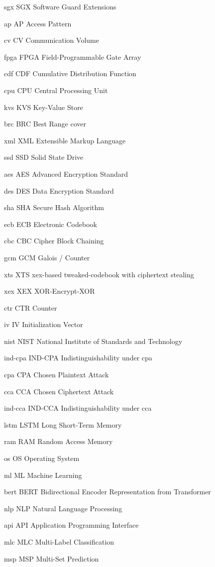 \newacronym%
	{sgx}
	{SGX}
	{Software Guard Extensions}

\newacronym%
	{ap}
	{AP}
	{Access Pattern}

\newacronym%
	{cv}
	{CV}
	{Communication Volume}

\newacronym%
	{fpga}
	{FPGA}
	{Field-Programmable Gate Array}

\newacronym%
	{cdf}
	{CDF}
	{Cumulative Distribution Function}

\newacronym%
	{cpu}
	{CPU}
	{Central Processing Unit}

\newacronym%
	{kvs}
	{KVS}
	{Key-Value Store}

\newacronym%
	{brc}
	{BRC}
	{Best Range cover}

\newacronym%
	{xml}
	{XML}
	{Extensible Markup Language}

\newacronym%
	{ssd}
	{SSD}
	{Solid State Drive}

\newacronym%
	{aes}
	{AES}
	{Advanced Encryption Standard}

\newacronym%
	{des}
	{DES}
	{Data Encryption Standard}

\newacronym%
	{sha}
	{SHA}
	{Secure Hash Algorithm}

\newacronym%
	{ecb}
	{ECB}
	{Electronic Codebook}

\newacronym%
	{cbc}
	{CBC}
	{Cipher Block Chaining}

\newacronym%
	{gcm}
	{GCM}
	{Galois / Counter}

\newacronym%
	{xts}
	{XTS}
	{\acrshort{xex}-based tweaked-codebook with ciphertext stealing}

\newacronym%
	{xex}
	{XEX}
	{XOR-Encrypt-XOR}

\newacronym%
	{ctr}
	{CTR}
	{Counter}

\newacronym%
	{iv}
	{IV}
	{Initialization Vector}

\newacronym%
	{nist}
	{NIST}
	{National Institute of Standards and Technology}

\newacronym%
	{ind-cpa}
	{IND-CPA}
	{Indistinguishability under \acrlong{cpa}}

\newacronym%
	{cpa}
	{CPA}
	{Chosen Plaintext Attack}

\newacronym%
	{cca}
	{CCA}
	{Chosen Ciphertext Attack}

\newacronym%
	{ind-cca}
	{IND-CCA}
	{Indistinguishability under \acrlong{cca}}

\newacronym%
	{lstm}
	{LSTM}
	{Long Short-Term Memory}

\newacronym%
	{ram}
	{RAM}
	{Random Access Memory}

\newacronym%
	{os}
	{OS}
	{Operating System}

\newacronym%
	{ml}
	{ML}
	{Machine Learning}

\newacronym%
	{bert}
	{BERT}
	{Bidirectional Encoder Representation from Transformer}

\newacronym%
	{nlp}
	{NLP}
	{Natural Language Processing}

\newacronym%
	{api}
	{API}
	{Application Programming Interface}

\newacronym%
	{mlc}
	{MLC}
	{Multi-Label Classification}

\newacronym%
	{msp}
	{MSP}
	{Multi-Set Prediction}
